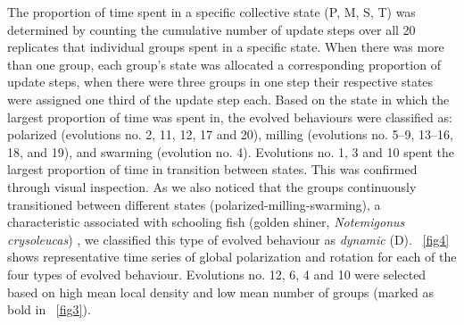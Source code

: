 The proportion of time spent in a specific collective state (P, M, S, T) was determined by counting the cumulative number of update steps over all 20 replicates that individual groups spent in a specific state. When there was more than one group, each group's state was allocated a corresponding proportion of update steps, \eg when there were three groups in one step their respective states were assigned one third of the update step each. Based on the state in which the largest proportion of time was spent in, the evolved behaviours were classified as: polarized (evolutions no. 2, 11, 12, 17 and 20), milling (evolutions no. 5--9, 13--16, 18, and 19), and swarming (evolution no. 4). Evolutions no. 1, 3 and 10 spent the largest proportion of time in transition between states. This was confirmed through visual inspection. As we also noticed that the groups continuously transitioned between different states (polarized-milling-swarming), a characteristic associated with schooling fish (golden shiner, \emph{Notemigonus crysoleucas}) \cite{tunstrom2013collective}, we classified this type of evolved behaviour as \emph{dynamic} (D). \figurename~\ref{fig4} shows representative time series of global polarization and rotation for each of the four types of evolved behaviour. Evolutions no. 12, 6, 4 and 10 were selected based on high mean local density and low mean number of groups (marked as bold in \figurename~\ref{fig3}). 

